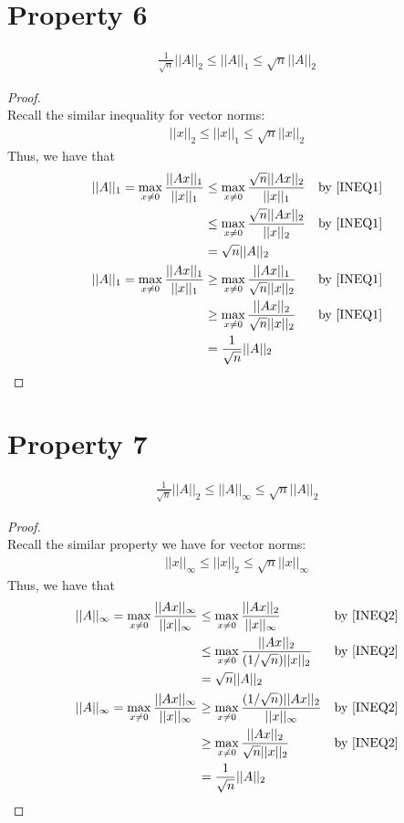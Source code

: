 \documentclass[10pt,a4paper]{article}
\theoremstyle{definition}
\theoremstyle{definition}
\numberwithin{equation}{section}
\begin{document}
\section*{Property 6}
\begin{align*}
\frac{1}{\sqrt{n}}||A||_2 \leq ||A||_1 \leq \sqrt{n}||A||_2
\end{align*}

\begin{proof}$ $
\\Recall the similar inequality for vector norms:
\begin{align}\label{INEQ1}
||x||_2 \leq ||x||_1 \leq \sqrt{n} ||x||_2
\end{align}
Thus, we have that
\begin{align*}
||A||_1 = \max_{x \neq 0} \frac{||Ax||_1}{||x||_1} &\leq \max_{x \neq 0} \frac{\sqrt{n}||Ax||_2}{||x||_1} &\text{by \eqref{INEQ1}}\\
&\leq \max_{x \neq 0} \frac{\sqrt{n}||Ax||_2}{||x||_2} &\text{by \eqref{INEQ1}}\\
&= \sqrt{n}||A||_2\\
||A||_1 = \max_{x \neq 0} \frac{||Ax||_1}{||x||_1} &\geq \max_{x \neq 0} \frac{||Ax||_1}{\sqrt{n}||x||_2} &\text{by \eqref{INEQ1}}\\
&\geq \max_{x \neq 0} \frac{||Ax||_2}{\sqrt{n}||x||_2} &\text{by \eqref{INEQ1}}\\
&= \frac{1}{\sqrt{n}} ||A||_2
\end{align*}
\end{proof}

\section*{Property 7}
\begin{align*}
\frac{1}{\sqrt{n}}||A||_2 \leq ||A||_\infty \leq \sqrt{n}||A||_2
\end{align*}

\begin{proof}$ $
\\Recall the similar property we have for vector norms:
\begin{align}\label{INEQ2}
||x||_\infty \leq ||x||_2 \leq \sqrt{n} ||x||_\infty
\end{align}
Thus, we have that
\begin{align*}
||A||_\infty = \max_{x \neq 0} \frac{||Ax||_\infty}{||x||_\infty} &\leq \max_{x \neq 0} \frac{||Ax||_2}{||x||_\infty} &\text{by \eqref{INEQ2}}\\
&\leq \max_{x \neq 0} \frac{||Ax||_2}{(1/\sqrt{n})||x||_2} &\text{by \eqref{INEQ2}}\\
&= \sqrt{n}||A||_2\\
||A||_\infty = \max_{x \neq 0} \frac{||Ax||_\infty}{||x||_\infty} &\geq \max_{x \neq 0} \frac{(1/\sqrt{n})||Ax||_2}{||x||_\infty} &\text{by \eqref{INEQ2}}\\
&\geq \max_{x \neq 0} \frac{||Ax||_2}{\sqrt{n}||x||_2} &\text{by \eqref{INEQ2}}\\
&= \frac{1}{\sqrt{n}} ||A||_2
\end{align*}
\end{proof}
\end{document}
